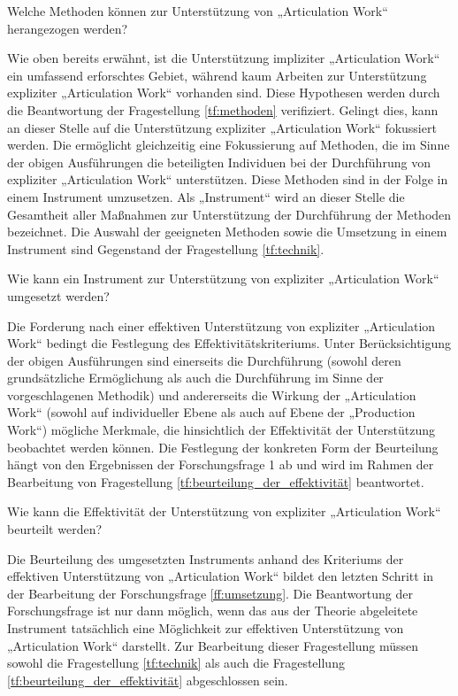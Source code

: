 \begin{tf}
	\label{tf:methoden}
	Welche Methoden können zur Unterstützung von „Articulation Work“ herangezogen werden?
\end{tf}

Wie oben bereits erwähnt, ist die Unterstützung impliziter „Articulation Work“ ein umfassend erforschtes Gebiet, während kaum Arbeiten zur Unterstützung expliziter „Articulation Work“ vorhanden sind. Diese Hypothesen werden durch die Beantwortung der Fragestellung \ref{tf:methoden} verifiziert. Gelingt dies, kann an dieser Stelle auf die Unterstützung expliziter „Articulation Work“ fokussiert werden. Die ermöglicht gleichzeitig eine Fokussierung auf Methoden, die im Sinne der obigen Ausführungen die beteiligten Individuen bei der Durchführung von expliziter „Articulation Work“ unterstützen. Diese Methoden sind in der Folge in einem Instrument umzusetzen. Als „Instrument“ wird an dieser Stelle die Gesamtheit aller Maßnahmen zur Unterstützung der Durchführung der Methoden bezeichnet. Die Auswahl der geeigneten Methoden sowie die Umsetzung in einem Instrument sind Gegenstand der Fragestellung \ref{tf:technik}.

\begin{tf}
	\label{tf:technik}
	Wie kann ein Instrument zur Unterstützung von expliziter „Articulation Work“ umgesetzt werden?
\end{tf}

Die Forderung nach einer effektiven Unterstützung von expliziter „Articulation Work“ bedingt die Festlegung des Effektivitätskriteriums. Unter Berücksichtigung der obigen Ausführungen sind einerseits die Durchführung (sowohl deren grundsätzliche Ermöglichung als auch die Durchführung im Sinne der vorgeschlagenen Methodik) und andererseits die Wirkung der „Articulation Work“ (sowohl auf individueller Ebene als auch auf Ebene der „Production Work“) mögliche Merkmale, die hinsichtlich der Effektivität der Unterstützung beobachtet werden können. Die Festlegung der konkreten Form der Beurteilung hängt von den Ergebnissen der Forschungsfrage 1 ab und wird im Rahmen der Bearbeitung von Fragestellung \ref{tf:beurteilung_der_effektivität} beantwortet.

\begin{tf}
	\label{tf:beurteilung_der_effektivität}
	Wie kann die Effektivität der Unterstützung von expliziter „Articulation Work“ beurteilt werden?
\end{tf}

Die Beurteilung des umgesetzten Instruments anhand des Kriteriums der effektiven Unterstützung von „Articulation Work“ bildet den letzten Schritt in der Bearbeitung der Forschungsfrage \ref{ff:umsetzung}. Die Beantwortung der Forschungsfrage ist nur dann möglich, wenn das aus der Theorie abgeleitete Instrument tatsächlich eine Möglichkeit zur effektiven Unterstützung von „Articulation Work“ darstellt. Zur Bearbeitung dieser Fragestellung müssen sowohl die Fragestellung \ref{tf:technik} als auch die Fragestellung \ref{tf:beurteilung_der_effektivität} abgeschlossen sein.

